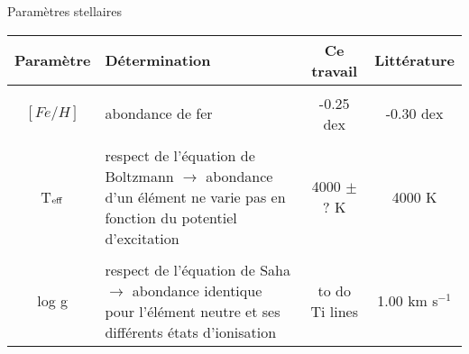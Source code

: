 \documentclass[10pt]{beamer}
\begin{document}
\begin{frame}[fragile]{Paramètres stellaires}







\begin{table}[h!]
    \begin{center}
        \begin{tabularx}{\textwidth}{c|X|c|c}
            Paramètre & Détermination & Ce travail & Littérature \\
            \hline
            &&\\
            $[Fe/H]$ &  abondance de fer & -0.25 dex & -0.30 dex \\
            &&\\
            T$_{\rm eff}$ & respect de l'équation de Boltzmann $\rightarrow$  abondance d'un élément ne varie pas en fonction du potentiel d'excitation & 4000 $\pm$ ? K  & 4000 K\\
            &&\\
            log g & respect de l'équation de Saha  $\rightarrow$ abondance identique pour l'élément neutre et ses différents états d'ionisation & to do Ti lines & 1.00 km s$^{-1}$\\
        \end{tabularx}
    \end{center}
\end{table}

\end{frame}
\end{document}
